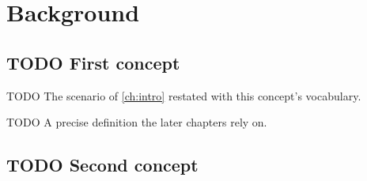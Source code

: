 \chapter{Background}\label{ch:background}

\section{TODO First concept}
\begin{runningexample}
TODO The scenario of \cref{ch:intro} restated with this concept's vocabulary.
\end{runningexample}

\begin{definition}[TODO]\label{def:example}
TODO A precise definition the later chapters rely on.
\end{definition}

\section{TODO Second concept}
